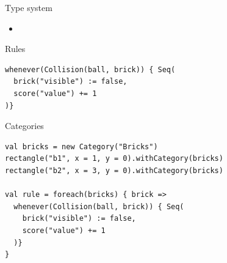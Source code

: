 \documentclass[12pt]{beamer}
\begin{document}
\begin{frame}{Type system}
\begin{itemize}
\item 
\end{itemize}
\end{frame}



\begin{frame}[fragile]{Rules}
\begin{lstlisting}
whenever(Collision(ball, brick)) { Seq(
  brick("visible") := false, 
  score("value") += 1
)}
\end{lstlisting}
\end{frame}

\begin{frame}[fragile]{Categories}
\begin{lstlisting}
val bricks = new Category("Bricks")
rectangle("b1", x = 1, y = 0).withCategory(bricks)
rectangle("b2", x = 3, y = 0).withCategory(bricks)

val rule = foreach(bricks) { brick =>
  whenever(Collision(ball, brick)) { Seq(
    brick("visible") := false,
    score("value") += 1
  )}
}
\end{lstlisting}
\end{frame}
\end{document}
